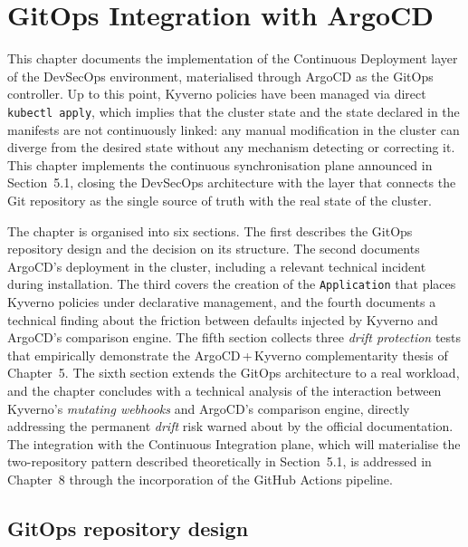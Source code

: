 \chapter{GitOps Integration with ArgoCD}

This chapter documents the implementation of the Continuous Deployment layer of the DevSecOps environment, materialised through ArgoCD as the GitOps controller. Up to this point, Kyverno policies have been managed via direct \texttt{kubectl apply}, which implies that the cluster state and the state declared in the manifests are not continuously linked: any manual modification in the cluster can diverge from the desired state without any mechanism detecting or correcting it. This chapter implements the continuous synchronisation plane announced in Section~5.1, closing the DevSecOps architecture with the layer that connects the Git repository as the single source of truth with the real state of the cluster.

The chapter is organised into six sections. The first describes the GitOps repository design and the decision on its structure. The second documents ArgoCD's deployment in the cluster, including a relevant technical incident during installation. The third covers the creation of the \texttt{Application} that places Kyverno policies under declarative management, and the fourth documents a technical finding about the friction between defaults injected by Kyverno and ArgoCD's comparison engine. The fifth section collects three \textit{drift protection} tests that empirically demonstrate the ArgoCD\,+\,Kyverno complementarity thesis of Chapter~5. The sixth section extends the GitOps architecture to a real workload, and the chapter concludes with a technical analysis of the interaction between Kyverno's \textit{mutating webhooks} and ArgoCD's comparison engine, directly addressing the permanent \textit{drift} risk warned about by the official documentation. The integration with the Continuous Integration plane, which will materialise the two-repository pattern described theoretically in Section~5.1, is addressed in Chapter~8 through the incorporation of the GitHub Actions pipeline.

\section{GitOps repository design}

